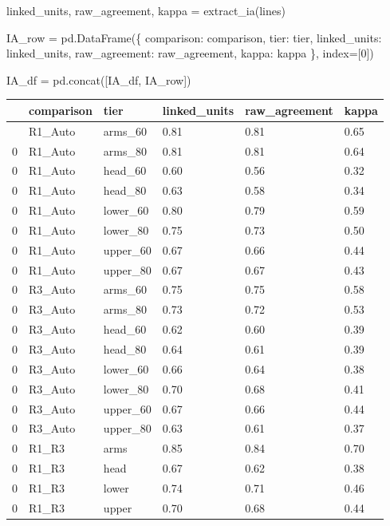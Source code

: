 \documentclass[
  letterpaper,
  DIV=11,
  numbers=noendperiod]{scrreprt}
\newenvironment{Shaded}{\begin{snugshade}}{\end{snugshade}}
\newcommand{\DecValTok}[1]{\textcolor[rgb]{0.68,0.00,0.00}{#1}}
\newcommand{\NormalTok}[1]{\textcolor[rgb]{0.00,0.23,0.31}{#1}}
\newcommand{\OperatorTok}[1]{\textcolor[rgb]{0.37,0.37,0.37}{#1}}
\newcommand{\StringTok}[1]{\textcolor[rgb]{0.13,0.47,0.30}{#1}}
\begin{document}
\begin{Shaded}
\begin{Highlighting}[]
\NormalTok{    linked\_units, raw\_agreement, kappa }\OperatorTok{=}\NormalTok{ extract\_ia(lines)}

\NormalTok{    IA\_row }\OperatorTok{=}\NormalTok{ pd.DataFrame(\{}
        \StringTok{\textquotesingle{}comparison\textquotesingle{}}\NormalTok{: comparison,}
        \StringTok{\textquotesingle{}tier\textquotesingle{}}\NormalTok{: tier,}
        \StringTok{\textquotesingle{}linked\_units\textquotesingle{}}\NormalTok{: linked\_units,}
        \StringTok{\textquotesingle{}raw\_agreement\textquotesingle{}}\NormalTok{: raw\_agreement,}
        \StringTok{\textquotesingle{}kappa\textquotesingle{}}\NormalTok{: kappa}
\NormalTok{    \}, index}\OperatorTok{=}\NormalTok{[}\DecValTok{0}\NormalTok{])}

\NormalTok{    IA\_df }\OperatorTok{=}\NormalTok{ pd.concat([IA\_df, IA\_row])}
\end{Highlighting}
\end{Shaded}

\begin{longtable}[]{@{}llllll@{}}
\toprule\noalign{}
& comparison & tier & linked\_units & raw\_agreement & kappa \\
\midrule\noalign{}
\endhead
\bottomrule\noalign{}
\endlastfoot
0 & R1\_Auto & arms\_60 & 0.81 & 0.81 & 0.65 \\
0 & R1\_Auto & arms\_80 & 0.81 & 0.81 & 0.64 \\
0 & R1\_Auto & head\_60 & 0.60 & 0.56 & 0.32 \\
0 & R1\_Auto & head\_80 & 0.63 & 0.58 & 0.34 \\
0 & R1\_Auto & lower\_60 & 0.80 & 0.79 & 0.59 \\
0 & R1\_Auto & lower\_80 & 0.75 & 0.73 & 0.50 \\
0 & R1\_Auto & upper\_60 & 0.67 & 0.66 & 0.44 \\
0 & R1\_Auto & upper\_80 & 0.67 & 0.67 & 0.43 \\
0 & R3\_Auto & arms\_60 & 0.75 & 0.75 & 0.58 \\
0 & R3\_Auto & arms\_80 & 0.73 & 0.72 & 0.53 \\
0 & R3\_Auto & head\_60 & 0.62 & 0.60 & 0.39 \\
0 & R3\_Auto & head\_80 & 0.64 & 0.61 & 0.39 \\
0 & R3\_Auto & lower\_60 & 0.66 & 0.64 & 0.38 \\
0 & R3\_Auto & lower\_80 & 0.70 & 0.68 & 0.41 \\
0 & R3\_Auto & upper\_60 & 0.67 & 0.66 & 0.44 \\
0 & R3\_Auto & upper\_80 & 0.63 & 0.61 & 0.37 \\
0 & R1\_R3 & arms & 0.85 & 0.84 & 0.70 \\
0 & R1\_R3 & head & 0.67 & 0.62 & 0.38 \\
0 & R1\_R3 & lower & 0.74 & 0.71 & 0.46 \\
0 & R1\_R3 & upper & 0.70 & 0.68 & 0.44 \\
\end{longtable}
\end{document}
